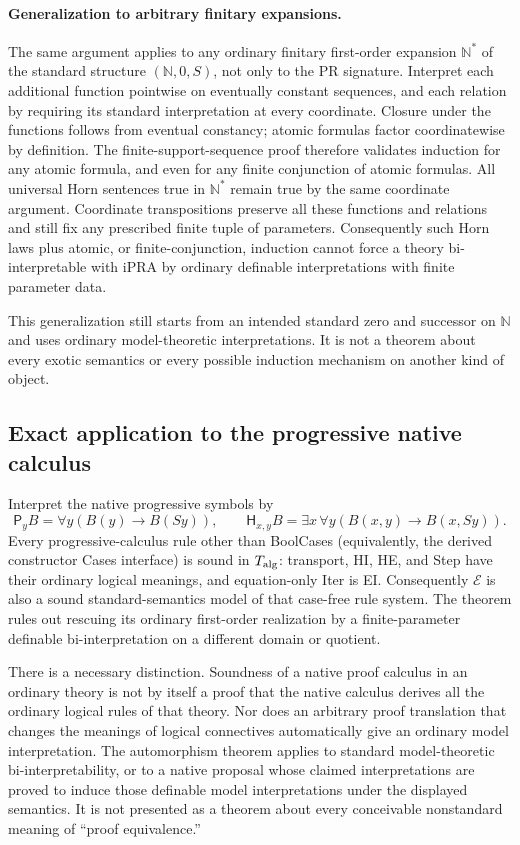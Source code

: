 \documentclass[11pt,letterpaper]{article}
\theoremstyle{definition}\newtheorem{definition}[theorem]{Definition}
\theoremstyle{remark}\newtheorem{remark}[theorem]{Remark}
\begin{document}
\paragraph{Generalization to arbitrary finitary expansions.}
The same argument applies to any ordinary finitary first-order expansion
$\mathbb N^*$ of the standard structure $(\mathbb N,0,S)$, not only
to the PR signature.  Interpret each additional function pointwise on
eventually constant sequences, and each relation by requiring its
standard interpretation at every coordinate.  Closure under the
functions follows from eventual constancy; atomic formulas factor
coordinatewise by definition.  The finite-support-sequence proof
therefore validates induction for any atomic formula, and even for
any finite conjunction of atomic formulas.  All universal Horn
sentences true in $\mathbb N^*$ remain true by the same coordinate
argument.  Coordinate transpositions preserve all these functions and
relations and still fix any prescribed finite tuple of parameters.
Consequently such Horn laws plus atomic, or finite-conjunction,
induction cannot force a theory bi-interpretable with iPRA by ordinary
definable interpretations with finite parameter data.

This generalization still starts from an intended standard zero and
successor on $\mathbb N$ and uses ordinary model-theoretic
interpretations.  It is not a theorem about every exotic semantics
or every possible induction mechanism on another kind of object.

\subsection{Exact application to the progressive native calculus}

Interpret the native progressive symbols by
\[
 \mathsf P_yB=\forall y(B(y)\to B(Sy)),\qquad
 \mathsf H_{x,y}B=\exists x\,\forall y(B(x,y)\to B(x,Sy)).
\]
Every progressive-calculus rule other than BoolCases (equivalently,
the derived constructor Cases interface) is sound in
$T_{\rm alg}$: transport, HI, HE, and Step have their ordinary logical
meanings, and equation-only Iter is EI.  Consequently $\mathcal E$
is also a sound standard-semantics model of that case-free rule system.
The theorem rules out rescuing its ordinary first-order realization
by a finite-parameter definable bi-interpretation on a different
domain or quotient.

There is a necessary distinction.  Soundness of a native proof calculus
in an ordinary theory is not by itself a proof that the native calculus
derives all the ordinary logical rules of that theory.  Nor does an
arbitrary proof translation that changes the meanings of logical
connectives automatically give an ordinary model interpretation.
The automorphism theorem applies to standard model-theoretic
bi-interpretability, or to a native proposal whose claimed interpretations
are proved to induce those definable model interpretations under the
displayed semantics.  It is not presented as a theorem about every
conceivable nonstandard meaning of ``proof equivalence.''
\end{document}
